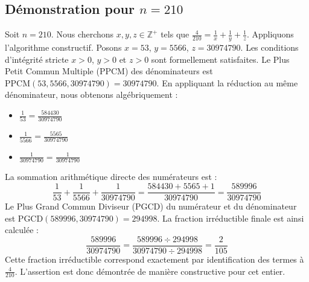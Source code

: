 \documentclass[11pt,a4paper]{article}
\begin{document}
\subsection{Démonstration pour $n = 210$}
Soit $n = 210$. Nous cherchons $x, y, z \in \mathbb{Z}^{+}$ tels que $\frac{4}{210} = \frac{1}{x} + \frac{1}{y} + \frac{1}{z}$.
Appliquons l'algorithme constructif. Posons $x = 53$, $y = 5566$, $z = 30974790$.
Les conditions d'intégrité stricte $x > 0$, $y > 0$ et $z > 0$ sont formellement satisfaites.
Le Plus Petit Commun Multiple (PPCM) des dénominateurs est $\text{PPCM}(53, 5566, 30974790) = 30974790$.
En appliquant la réduction au même dénominateur, nous obtenons algébriquement :
\begin{itemize}
    \item $\frac{1}{53} = \frac{584430}{30974790}$
    \item $\frac{1}{5566} = \frac{5565}{30974790}$
    \item $\frac{1}{30974790} = \frac{1}{30974790}$
\end{itemize}
La sommation arithmétique directe des numérateurs est :
$$ \frac{1}{53} + \frac{1}{5566} + \frac{1}{30974790} = \frac{584430 + 5565 + 1}{30974790} = \frac{589996}{30974790} $$
Le Plus Grand Commun Diviseur (PGCD) du numérateur et du dénominateur est $\text{PGCD}(589996, 30974790) = 294998$.
La fraction irréductible finale est ainsi calculée :
$$ \frac{589996}{30974790} = \frac{589996 \div 294998}{30974790 \div 294998} = \frac{2}{105} $$
Cette fraction irréductible correspond exactement par identification des termes à $\frac{4}{210}$. L'assertion est donc démontrée de manière constructive pour cet entier.
\end{document}
